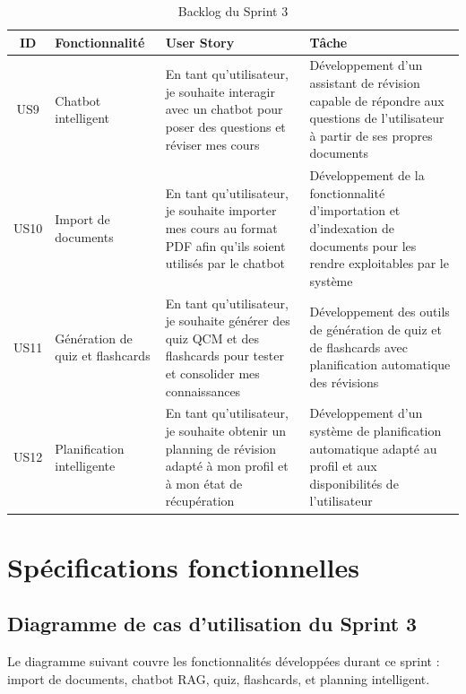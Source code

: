 \begin{table}[H]
\centering
\renewcommand{\arraystretch}{1.3}
\begin{tabular}{|c|p{3cm}|p{6cm}|p{4cm}|}
\hline
\textbf{ID} & \textbf{Fonctionnalité} & \textbf{User Story} & \textbf{Tâche} \\
\hline

US9 & Chatbot intelligent
& En tant qu'utilisateur, je souhaite interagir avec un chatbot pour poser des
  questions et réviser mes cours
& Développement d'un assistant de révision capable de répondre aux questions
  de l'utilisateur à partir de ses propres documents \\ \hline

US10 & Import de documents
& En tant qu'utilisateur, je souhaite importer mes cours au format PDF afin
  qu'ils soient utilisés par le chatbot
& Développement de la fonctionnalité d'importation et d'indexation de documents
  pour les rendre exploitables par le système \\ \hline

US11 & Génération de quiz et flashcards
& En tant qu'utilisateur, je souhaite générer des quiz QCM et des flashcards
  pour tester et consolider mes connaissances
& Développement des outils de génération de quiz et de flashcards avec
  planification automatique des révisions \\ \hline

US12 & Planification intelligente
& En tant qu'utilisateur, je souhaite obtenir un planning de révision adapté
  à mon profil et à mon état de récupération
& Développement d'un système de planification automatique adapté au profil
  et aux disponibilités de l'utilisateur \\ \hline

\end{tabular}
\caption{Backlog du Sprint 3}
\label{tab:backlogs3}
\end{table}

\section{Spécifications fonctionnelles}

\subsection{Diagramme de cas d'utilisation du Sprint 3}

Le diagramme suivant couvre les fonctionnalités développées durant ce sprint : import de documents, chatbot RAG, quiz, flashcards, et planning intelligent.

